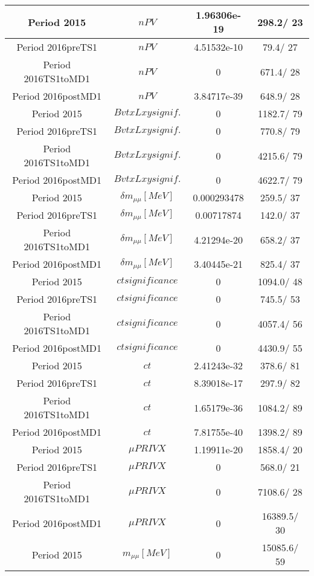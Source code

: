 \documentclass{article}
\begin{document}
\begin{longtable}{c|c|c|c}
\hline
 Period 2015 & $nPV$ & 1.96306e-19 & 298.2/ 23\\
\hline
 Period 2016preTS1 & $nPV$ & 4.51532e-10 &  79.4/ 27\\
\hline
 Period 2016TS1toMD1 & $nPV$ & 0 & 671.4/ 28\\
\hline
 Period 2016postMD1 & $nPV$ & 3.84717e-39 & 648.9/ 28\\
\hline
 Period 2015 & $BvtxLxy signif.$ & 0 & 1182.7/ 79\\
\hline
 Period 2016preTS1 & $BvtxLxy signif.$ & 0 & 770.8/ 79\\
\hline
 Period 2016TS1toMD1 & $BvtxLxy signif.$ & 0 & 4215.6/ 79\\
\hline
 Period 2016postMD1 & $BvtxLxy signif.$ & 0 & 4622.7/ 79\\
\hline
 Period 2015 & $\delta m_{\mu\mu} [MeV]$ & 0.000293478 & 259.5/ 37\\
\hline
 Period 2016preTS1 & $\delta m_{\mu\mu} [MeV]$ & 0.00717874 & 142.0/ 37\\
\hline
 Period 2016TS1toMD1 & $\delta m_{\mu\mu} [MeV]$ & 4.21294e-20 & 658.2/ 37\\
\hline
 Period 2016postMD1 & $\delta m_{\mu\mu} [MeV]$ & 3.40445e-21 & 825.4/ 37\\
\hline
 Period 2015 & $ct significance$ & 0 & 1094.0/ 48\\
\hline
 Period 2016preTS1 & $ct significance$ & 0 & 745.5/ 53\\
\hline
 Period 2016TS1toMD1 & $ct significance$ & 0 & 4057.4/ 56\\
\hline
 Period 2016postMD1 & $ct significance$ & 0 & 4430.9/ 55\\
\hline
 Period 2015 & $ct$ & 2.41243e-32 & 378.6/ 81\\
\hline
 Period 2016preTS1 & $ct$ & 8.39018e-17 & 297.9/ 82\\
\hline
 Period 2016TS1toMD1 & $ct$ & 1.65179e-36 & 1084.2/ 89\\
\hline
 Period 2016postMD1 & $ct$ & 7.81755e-40 & 1398.2/ 89\\
\hline
 Period 2015 & $\mu PRIVX$ & 1.19911e-20 & 1858.4/ 20\\
\hline
 Period 2016preTS1 & $\mu PRIVX$ & 0 & 568.0/ 21\\
\hline
 Period 2016TS1toMD1 & $\mu PRIVX$ & 0 & 7108.6/ 28\\
\hline
 Period 2016postMD1 & $\mu PRIVX$ & 0 & 16389.5/ 30\\
\hline
 Period 2015 & $m_{\mu\mu} [MeV]$ & 0 & 15085.6/ 59\\

\end{longtable}
\end{document}
